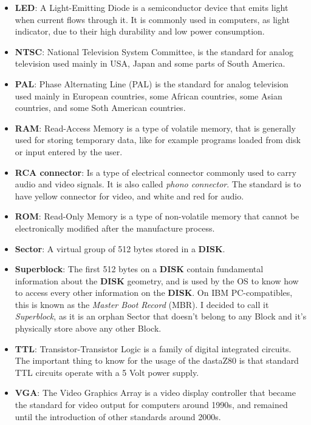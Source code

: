 \begin{itemize}
    \item \textbf{LED}: A Light-Emitting Diode is a semiconductor device that
        emits light when current flows through it. It is commonly used in
        computers, as light indicator, due to their high durability and low
        power consumption.
        \item \textbf{NTSC}: National Television System Committee, is the
        standard for analog television used mainly in USA, Japan and some parts
        of South America.
    \item \textbf{PAL}: Phase Alternating Line (PAL) is the standard for analog
        television used mainly in European countries, some African countries,
        some Asian countries, and some Soth American countries.
    \item \textbf{RAM}: Read-Access Memory is a type of volatile memory, that is
        generally used for storing temporary data, like for example programs
        loaded from disk or input entered by the user.
    \item \textbf{RCA connector}: Is a type of electrical connector commonly
        used to carry audio and video signals. It is also called
        \textit{phono connector}. The standard is to have yellow connector for
        video, and white and red for audio.
    \item \textbf{ROM}: Read-Only Memory is a type of non-volatile memory that 
        cannot be electronically modified after the manufacture process.
    \item \textbf{Sector}: A virtual group of 512 bytes stored in a
        \textbf{DISK}. 
    \item \textbf{Superblock}: The first 512 bytes on a \textbf{DISK} contain
        fundamental information about the \textbf{DISK} geometry, and is used by
        the OS to know how to access every other information on the
        \textbf{DISK}. On IBM PC-compatibles, this is known as the
        \textit{Master Boot Record} (MBR). I decided to call it
        \textit{Superblock}, as it is an orphan Sector that doesn't belong to
        any Block and it's physically store above any other Block.
    \item \textbf{TTL}: Transistor-Transistor Logic is a family of digital
        integrated circuits. The important thing to know for the usage of the
        dastaZ80 is that standard TTL circuits operate with a 5 Volt power
        supply.
    \item \textbf{VGA}: The Video Graphics Array is a video display controller
        that became the standard for video output for computers around 1990s,
        and remained until the introduction of other standards around 2000s.
\end{itemize}